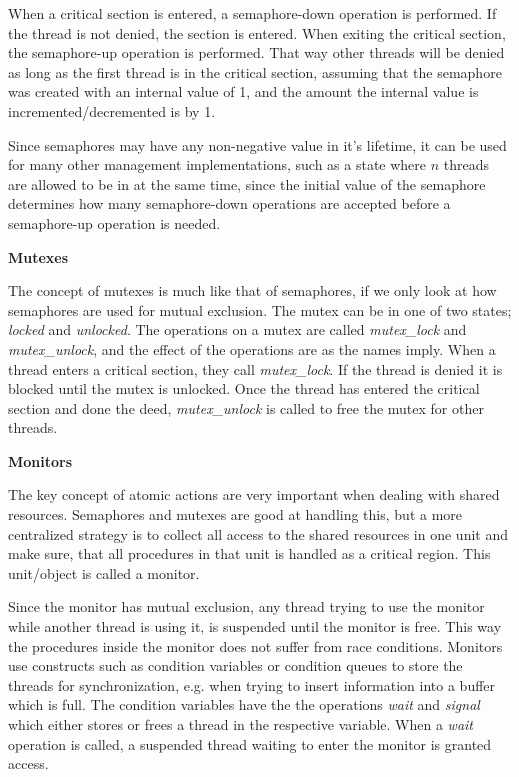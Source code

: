 When a critical section is entered, a semaphore-down operation is performed. If the thread is not denied, the section is entered. When exiting the critical section, the semaphore-up operation is performed. That way other threads will be denied as long as the first thread is in the critical section, assuming that the semaphore was created with an internal value of 1, and the amount the internal value is incremented/decremented is by 1. 

Since semaphores may have any non-negative value in it's lifetime, it can be used for many other management implementations, such as a state where $n$ threads are allowed to be in at the same time, since the initial value of the semaphore determines how many semaphore-down operations are accepted before a semaphore-up operation is needed. 

\textbf{Mutexes}

The concept of mutexes is much like that of semaphores, if we only look at how semaphores are used for mutual exclusion. The mutex can be in one of two states; \textit{locked} and \textit{unlocked}. The operations on a mutex are called \textit{mutex\_lock} and \textit{mutex\_unlock}, and the effect of the operations are as the names imply. When a thread enters a critical section, they call \textit{mutex\_lock}. If the thread is denied it is blocked until the mutex is unlocked. Once the thread has entered the critical section and done the deed, \textit{mutex\_unlock} is called to free the mutex for other threads.

\textbf{Monitors}

The key concept of atomic actions are very important when dealing with shared resources. Semaphores and mutexes are good at handling this, but a more centralized strategy is to collect all access to the shared resources in one unit and make sure, that all procedures in that unit is handled as a critical region. This unit/object is called a monitor. 

Since the monitor has mutual exclusion, any thread trying to use the monitor while another thread is using it, is suspended until the monitor is free. This way the procedures inside the monitor does not suffer from race conditions. Monitors use constructs such as condition variables or condition queues to store the threads for synchronization, e.g. when trying to insert information into a buffer which is full. The condition variables have the the operations \textit{wait} and \textit{signal} which either stores or frees a thread in the respective variable. When a \textit{wait} operation is called, a suspended thread waiting to enter the monitor is granted access. 

